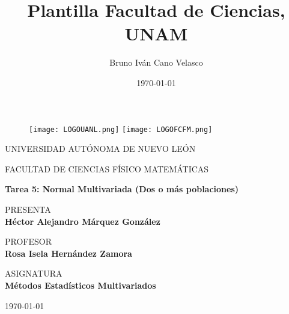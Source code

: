 \documentclass{article}
\title{Plantilla Facultad de Ciencias, UNAM}
\author{Bruno Iván Cano Velasco}
\date{\today}
\begin{document}
\thispagestyle{empty}
	
	\begin{figure}[ht]
			\texttt{[image: LOGOUANL.png]}
			\label{EscudoUNAM}
	   \endminipage
			\texttt{[image: LOGOFCFM.png]}
			\label{EscudoFC}
		\endminipage
	\end{figure}
	
	\begin{center}
	\vspace{0.8cm}
	\LARGE
	UNIVERSIDAD AUTÓNOMA DE NUEVO LEÓN
	
	\vspace{0.8cm}
	\LARGE
	FACULTAD DE CIENCIAS FÍSICO MATEMÁTICAS
	
	\vspace{1.7cm}	
	\Large
	\textbf{Tarea 5: Normal Multivariada (Dos o más poblaciones)}

	\vspace{1.3cm}
	\normalsize	
	PRESENTA \\
	\vspace{.3cm}
	\large
	\textbf{Héctor Alejandro Márquez González}
	
	\vspace{1.3cm}
	\normalsize	
	PROFESOR \\
	\vspace{.3cm}
	\large
	\textbf{Rosa Isela Hernández Zamora}
	
	\vspace{1.3cm}
	\normalsize	
	ASIGNATURA \\
	\vspace{.3cm}
	\large
	\textbf{Métodos Estadísticos Multivariados}
	
	\vspace{1.3cm}
	\today
	\end{center}
	
	\newpage
	
\end{document}
